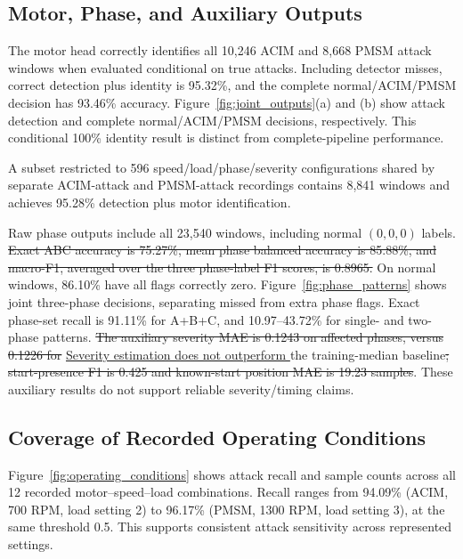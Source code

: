 \documentclass[conference,letterpaper]{IEEEtran}
\providecommand{\DIFadd}[1]{{\protect\color{blue}\uline{#1}}} %
\providecommand{\DIFdel}[1]{{\protect\color{red}\sout{#1}}}                      %
\providecommand{\DIFaddbegin}{} %
\providecommand{\DIFaddend}{} %
\providecommand{\DIFdelbegin}{} %
\providecommand{\DIFdelend}{} %
\begin{document}
\subsection{Motor, Phase, and Auxiliary Outputs}
The motor head correctly identifies all 10,246 ACIM and 8,668 PMSM attack windows when evaluated conditional on true attacks. Including detector misses, correct detection plus identity is 95.32\%, and the complete normal/ACIM/PMSM decision has 93.46\% accuracy. Figure~\ref{fig:joint_outputs}(a) and (b) show attack detection and complete normal/ACIM/PMSM decisions, respectively. This conditional 100\% identity result is distinct from complete-pipeline performance.

A subset restricted to 596 speed/load/phase/severity configurations shared by separate ACIM-attack and PMSM-attack recordings contains 8,841 windows and achieves 95.28\% detection plus motor identification.

Raw phase outputs include all 23,540 windows, including normal $(0,0,0)$ labels. \DIFdelbegin \DIFdel{Exact ABC accuracy is 75.27\%, mean phase balanced accuracy is 85.88\%, and macro-F1, averaged over the three phase-label F1 scores, is 0.8965. }\DIFdelend On normal windows, 86.10\% have all flags correctly zero. Figure~\ref{fig:phase_patterns} shows joint three-phase decisions, separating missed from extra phase flags. Exact phase-set recall is 91.11\% for A+B+C, and 10.97--43.72\% for single- and two-phase patterns. \DIFdelbegin \DIFdel{The auxiliary severity MAE is 0.1243 on affected phases, versus 0.1226 for }\DIFdelend \DIFaddbegin \DIFadd{Severity estimation does not outperform }\DIFaddend the training-median baseline\DIFdelbegin \DIFdel{; start-presence F1 is 0.425 and known-start position MAE is 19.23 samples}\DIFdelend . These auxiliary results do not support reliable severity/timing claims.







\subsection{Coverage of Recorded Operating Conditions}


Figure~\ref{fig:operating_conditions} shows attack recall and sample counts across all 12 recorded motor--speed--load combinations. Recall ranges from 94.09\% (ACIM, 700 RPM, load setting 2) to 96.17\% (PMSM, 1300 RPM, load setting 3), at the same threshold 0.5. This supports consistent attack sensitivity across represented settings.
\end{document}

